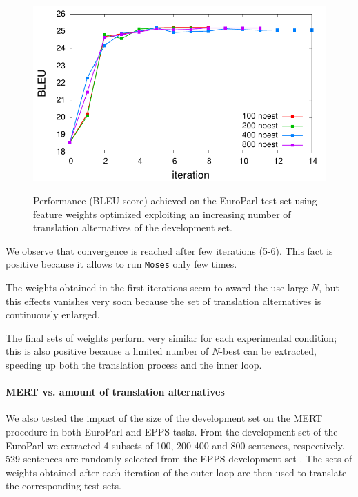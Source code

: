 \documentclass[10pt]{report}
\theoremstyle{plain}
\begin{document}
{\begin{figure}[ht]
\begin{center}
\label{fig:MERT-epps-nbest}
 \includegraphics[width=\columnwidth]{MERT-nbest}
\caption{Performance (BLEU score) achieved on the EuroParl test set using feature weights optimized exploiting an increasing number of translation alternatives of the development set.}
\end{center}
 \end{figure}

We observe that convergence is reached after few iterations (5-6). This fact is positive because it allows to run {\tt Moses} only few times.

The weights obtained in the first iterations seem to award the use large $N$, but this effects vanishes very soon because the set of translation alternatives is continuously enlarged.

The final sets of weights perform very similar for each experimental condition; this is also positive because a limited number of $N$-best can be extracted, speeding up both the translation process and the inner loop.


\paragraph{MERT vs. amount of translation alternatives}
We also tested the impact of the size of the development set on the MERT procedure in both EuroParl and EPPS tasks. 
From the  development set of the EuroParl we extracted 4 subsets of 100, 200 400 and 800 sentences, respectively. 529 sentences are randomly selected from the EPPS development set .
The sets of weights obtained after each iteration of the outer loop are then used to translate the corresponding test sets.

}
\end{document}
